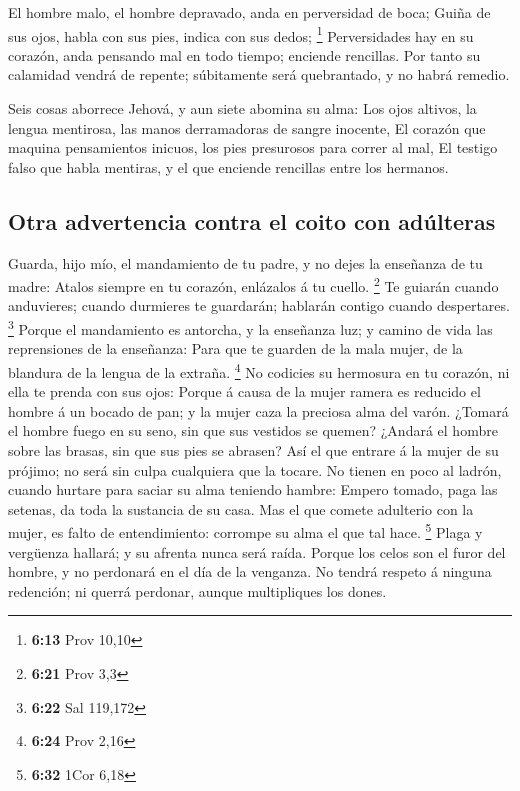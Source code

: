  El hombre malo, el hombre depravado, anda en perversidad
de boca;  Guiña de sus ojos, habla con sus pies, indica
con sus dedos; \footnote{\textbf{6:13} Prov 10,10} 
Perversidades hay en su corazón, anda pensando mal en todo tiempo;
enciende rencillas.  Por tanto su calamidad vendrá de
repente; súbitamente será quebrantado, y no habrá remedio.

 Seis cosas aborrece Jehová, y aun siete abomina su alma:
 Los ojos altivos, la lengua mentirosa, las manos
derramadoras de sangre inocente,  El corazón que maquina
pensamientos inicuos, los pies presurosos para correr al mal,
 El testigo falso que habla mentiras, y el que enciende
rencillas entre los hermanos.

\hypertarget{otra-advertencia-contra-el-coito-con-aduxfalteras}{%
\subsection{Otra advertencia contra el coito con
adúlteras}\label{otra-advertencia-contra-el-coito-con-aduxfalteras}}

 Guarda, hijo mío, el mandamiento de tu padre, y no dejes
la enseñanza de tu madre:  Atalos siempre en tu corazón,
enlázalos á tu cuello. \footnote{\textbf{6:21} Prov 3,3} 
Te guiarán cuando anduvieres; cuando durmieres te guardarán; hablarán
contigo cuando despertares. \footnote{\textbf{6:22} Sal 119,172}
 Porque el mandamiento es antorcha, y la enseñanza luz; y
camino de vida las reprensiones de la enseñanza:  Para
que te guarden de la mala mujer, de la blandura de la lengua de la
extraña. \footnote{\textbf{6:24} Prov 2,16}  No codicies
su hermosura en tu corazón, ni ella te prenda con sus ojos:
 Porque á causa de la mujer ramera es reducido el hombre
á un bocado de pan; y la mujer caza la preciosa alma del varón.
 ¿Tomará el hombre fuego en su seno, sin que sus vestidos
se quemen?  ¿Andará el hombre sobre las brasas, sin que
sus pies se abrasen?  Así el que entrare á la mujer de su
prójimo; no será sin culpa cualquiera que la tocare.  No
tienen en poco al ladrón, cuando hurtare para saciar su alma teniendo
hambre:  Empero tomado, paga las setenas, da toda la
sustancia de su casa.  Mas el que comete adulterio con la
mujer, es falto de entendimiento: corrompe su alma el que tal hace.
\footnote{\textbf{6:32} 1Cor 6,18}  Plaga y vergüenza
hallará; y su afrenta nunca será raída.  Porque los celos
son el furor del hombre, y no perdonará en el día de la venganza.
 No tendrá respeto á ninguna redención; ni querrá
perdonar, aunque multipliques los dones.

